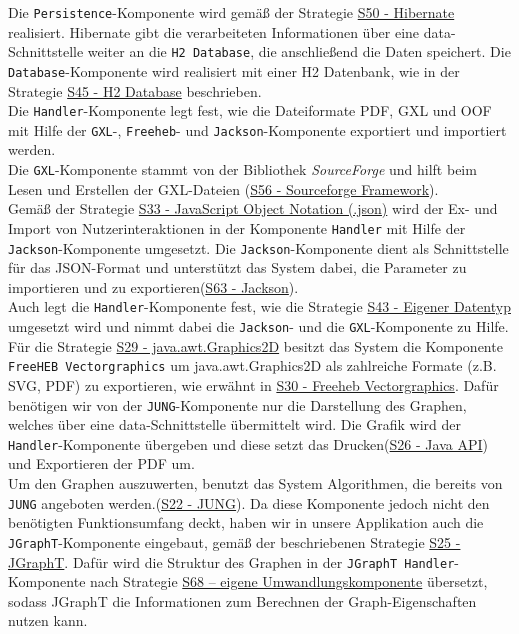 \documentclass[enabledeprecatedfontcommands,fontsize=11pt,paper=a4,twoside]{scrartcl}
\newcounter{one}
\begin{document}
Die \texttt{Persistence}-Komponente wird gemäß der Strategie \hyperlink{rrr}{S50 - Hibernate} realisiert.
Hibernate gibt die verarbeiteten Informationen über eine data-Schnittstelle weiter an die \texttt{H2 Database}, die anschließend die Daten speichert. Die \texttt{Database}-Komponente wird realisiert mit einer H2 Datenbank, wie in der Strategie \hyperlink{ppp}{S45 - H2 Database} beschrieben.\\ 

Die \texttt{Handler}-Komponente legt fest, wie die Dateiformate PDF, GXL und OOF mit Hilfe der \texttt{GXL}-, \texttt{Freeheb}- und \texttt{Jackson}-Komponente exportiert und importiert werden. \\
Die \texttt{GXL}-Komponente stammt von der Bibliothek \textit{SourceForge} und hilft beim Lesen und Erstellen der GXL-Dateien (\hyperlink{ttt}{S56 - Sourceforge Framework}). \\
Gemäß der Strategie \hyperlink{jjj}{S33 - JavaScript Object Notation (.json)} wird der Ex- und Import von Nutzerinteraktionen in der Komponente \texttt{Handler} mit Hilfe der \texttt{Jackson}-Komponente umgesetzt. Die \texttt{Jackson}-Komponente dient als Schnittstelle für das JSON-Format und unterstützt das System dabei, die Parameter zu importieren und zu exportieren(\hyperlink{www}{S63 - Jackson}).\\
Auch legt die \texttt{Handler}-Komponente fest, wie die Strategie \hyperlink{ooo}{S43 - Eigener Datentyp} umgesetzt wird und nimmt dabei die \texttt{Jackson}- und die \texttt{GXL}-Komponente zu Hilfe. \\
Für die Strategie \hyperlink{hhh}{S29 - java.awt.Graphics2D} besitzt das System die Komponente \texttt{FreeHEB Vectorgraphics} um java.awt.Graphics2D als zahlreiche Formate (z.B. SVG, PDF) zu exportieren, wie erwähnt in \hyperlink{iii}{S30 - Freeheb Vectorgraphics}. Dafür benötigen wir von der \texttt{JUNG}-Komponente nur die Darstellung des Graphen, welches über eine data-Schnittstelle übermittelt wird. Die Grafik wird der \texttt{Handler}-Komponente übergeben und diese setzt das Drucken(\hyperlink{ggg}{S26 - Java API}) und Exportieren der PDF um. \\ 

Um den Graphen auszuwerten, benutzt das System Algorithmen, die bereits von \texttt{JUNG} angeboten werden.(\hyperlink{fff}{S22 - JUNG}). Da diese Komponente jedoch nicht den benötigten Funktionsumfang deckt, haben wir in unsere Applikation auch die \texttt{JGraphT}-Komponente eingebaut, gemäß der beschriebenen Strategie  \hyperlink{xxx}{S25 - JGraphT}. Dafür wird die Struktur des Graphen in der \texttt{JGraphT Handler}-Komponente nach Strategie \hyperlink{umwandlungskomponente}{S68 – eigene Umwandlungskomponente} übersetzt, sodass JGraphT die Informationen zum Berechnen der Graph-Eigenschaften nutzen kann. \\ 
\end{document}
